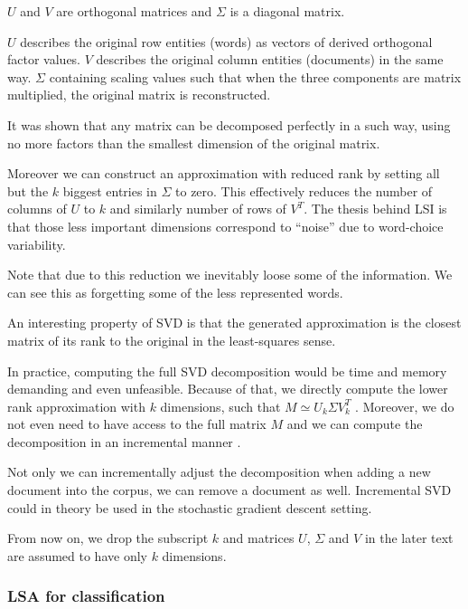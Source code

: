     $U$ and $V$ are orthogonal matrices and $\Sigma$ is a diagonal matrix.
    
    {}

    $U$ describes the original row entities (words) as vectors of derived orthogonal  factor values. 
    $V$ describes the original column entities (documents) in the same way.
    $\Sigma$ containing scaling values such that when the three components are matrix multiplied, the original matrix is reconstructed.

    It was shown that any matrix can be decomposed perfectly in a such way, using no more factors than the smallest dimension of the original matrix.
    
    Moreover we can construct an approximation with reduced rank by setting all but the $k$ biggest entries in $\Sigma$ to zero. 
    This effectively reduces the number of columns of $U$ to $k$ and similarly number of rows of $V^T$.
    The thesis behind LSI is that those less important dimensions correspond to “noise” due to word-choice variability.
    
    Note that due to this reduction we inevitably loose some of the information. 
    We can see this as forgetting some of the less represented words.

    An interesting property of SVD is that the generated approximation is the closest matrix of its rank to the original in the least-squares sense.

    In practice, computing the full SVD decomposition would be time and memory demanding and even unfeasible.
    Because of that, we directly compute the lower rank approximation with $k$ dimensions,
    such that $M \simeq U_k \Sigma V_k^T$ \cite{halko2011finding}. %
    Moreover, we do not even need to have access to the full matrix $M$ and we can compute the decomposition in an incremental manner \cite{brand2006fast}. %
    
    Not only we can incrementally adjust the decomposition when adding a new document into the corpus, we can remove a document as well.
    Incremental SVD could in theory be used in the stochastic gradient descent setting.
    
    From now on, we drop the subscript $k$ and matrices $U$, $\Sigma$ and $V$ in the later text are assumed to have only $k$ dimensions.
    
    
    \subsubsection{LSA for classification}
    
